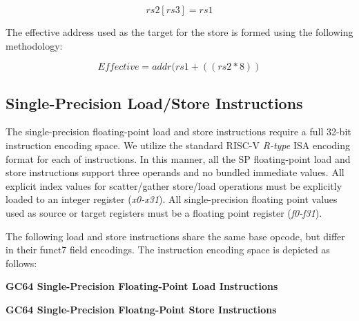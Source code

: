 \documentclass{article}
\begin{document}
\begin{equation}
rs2[rs3] = rs1
\end{equation}

The effective address used as the target
for the store is formed using the following methodology:

\begin{equation}
Effective = addr(rs1 + ((rs2 * 8))
\end{equation}


\subsection{Single-Precision Load/Store Instructions}

The single-precision floating-point load and store instructions
require a full 32-bit instruction encoding space.  We utilize the 
standard RISC-V \emph{R-type} ISA encoding format for each of instructions.  In
this manner, all the SP floating-point load and store instructions support
three operands and no bundled immediate values.  All explicit index
values for scatter/gather store/load operations must be explicitly
loaded to an integer register (\emph{x0-x31}).  All single-precision
floating point values used as source or target registers must be a floating
point register (\emph{f0-f31}).

The following load and store instructions share the same base
opcode, but differ in their funct7 field encodings.  The instruction
encoding space is depicted as follows:


\begin{center}
\textbf{GC64 Single-Precision Floating-Point Load Instructions}
\makebox[0.03in][s]{}\makebox[0.03in][s]{}\makebox[0.03in][s]{}\makebox[0.03in][s]{}\makebox[0.03in][s]{}
\end{center}

\begin{center}
\textbf{GC64 Single-Precision Floatng-Point Store Instructions}
\makebox[0.03in][s]{}\makebox[0.03in][s]{}\makebox[0.03in][s]{}\makebox[0.03in][s]{}\makebox[0.03in][s]{}
\end{center}
\end{document}
